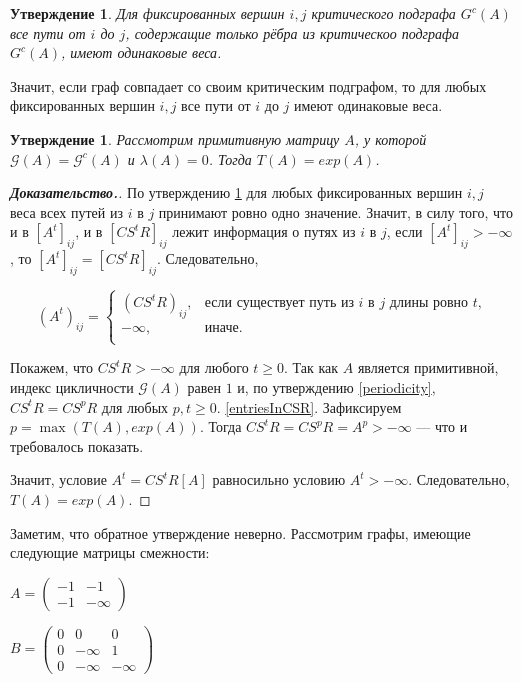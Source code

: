\documentclass[12pt]{article}
\newtheorem{proposition}[theorem]{Утверждение}
\theoremstyle{definition}
\begin{document}
\begin{proposition} \cite[следствие 3.97]{synchronizationAndLinearity}
\label{sameWeight}
Для фиксированных вершин $i, j$ критического подграфа $G^c(A)$ все пути от $i$ до $j$, содержащие только рёбра из критическоо подграфа $G^c(A)$, имеют одинаковые веса.
\end{proposition}

Значит, если граф совпадает со своим критическим подграфом, то для любых фиксированных вершин $i, j$ все пути от $i$ до $j$ имеют одинаковые веса.

\begin{proposition} \label{onePathProposition}
Рассмотрим примитивную матрицу $A$, у которой $\mathcal{G}(A) = \mathcal{G}^c(A)$ и $\lambda(A) = 0$. Тогда $T(A) = exp(A)$.
\end{proposition}
\begin{proof}[\textbf{Доказательство.}]
По утверждению \ref{sameWeight} для любых фиксированных вершин $i, j$ веса всех путей из $i$ в $j$ принимают ровно одно значение. Значит, в силу того, что и в $[A^t]_{ij}$, и в $[CS^tR]_{ij}$ лежит информация о путях из $i$ в $j$, если $[A^t]_{ij} > -\infty$, то $[A^t]_{ij} = [CS^tR]_{ij}$. Следовательно,

\begin{equation*}
(A^t)_{ij} = \begin{cases}(CS^tR)_{ij}, &\text{если существует путь из $i$ в $j$ длины ровно $t$,}\\
-\infty, & \text{иначе.}\\
\end{cases}
\end{equation*}

Покажем, что $CS^tR > -\infty$ для любого $t \ge 0$. Так как $A$ является примитивной, индекс цикличности $\mathcal{G}(A)$ равен $1$ и, по утверждению \ref{periodicity}, $CS^tR = CS^pR$ для любых $p, t \ge 0$. \ref{entriesInCSR}. Зафиксируем $p = \max(T(A), exp(A))$. Тогда $CS^tR = CS^pR = A^p > -\infty$ --- что и требовалось показать.

Значит, условие $A^t = CS^tR[A]$ равносильно условию $A^t > -\infty$. Следовательно, $T(A) = exp(A)$.
\end{proof}

Заметим, что обратное утверждение неверно. Рассмотрим графы, имеющие следующие матрицы смежности:

\begin{minipage}[t]{0.4\textwidth}
\centering
$A = \begin{pmatrix}
    -1 & -1 \\
    -1 & -\infty
    \end{pmatrix}$
\end{minipage}
\begin{minipage}[t]{0.4\textwidth}
\centering
$B = \begin{pmatrix}
    0 & 0 & 0 \\
    0 & -\infty & 1 \\
    0 & -\infty & -\infty
    \end{pmatrix}$
\end{minipage}
\end{document}
